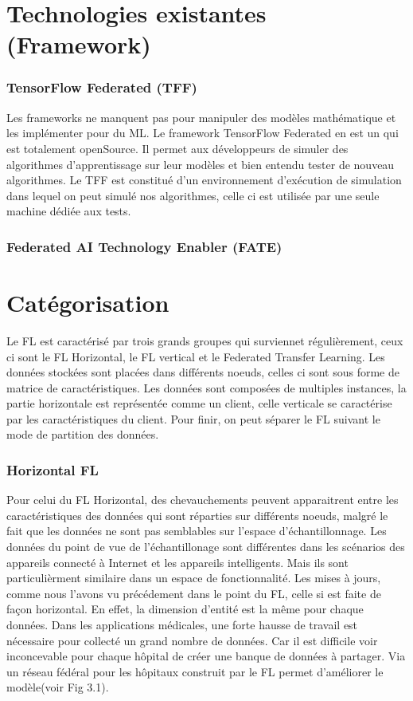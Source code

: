 \documentclass[12pt,a4paper]{report}
\begin{document}
\pagebreak

\chapter{Technologies existantes (Framework)}
\subsection{TensorFlow Federated (TFF)}

Les frameworks ne manquent pas pour manipuler des modèles mathématique et les implémenter pour du ML. Le framework TensorFlow Federated en est un qui est totalement openSource. Il permet aux développeurs de simuler des algorithmes d'apprentissage sur leur modèles et bien entendu tester de nouveau algorithmes. Le TFF est constitué d'un environnement d'exécution de simulation dans lequel on peut simulé nos algorithmes, celle ci est utilisée par une seule machine dédiée aux tests.

\subsection{Federated AI Technology Enabler (FATE)}

\chapter{Catégorisation}

Le FL est caractérisé par trois grands groupes qui surviennet régulièrement, ceux ci sont le FL Horizontal, le FL vertical et le Federated Transfer Learning. Les données stockées sont placées dans différents noeuds, celles ci sont sous forme de matrice de caractéristiques. Les données sont composées de multiples instances, la partie horizontale est représentée comme un client, celle verticale se caractérise par les caractéristiques du client. Pour finir, on peut séparer le FL suivant le mode de partition des données.\\

\subsection{Horizontal FL}

Pour celui du FL Horizontal, des chevauchements peuvent apparaitrent entre les caractéristiques des données qui sont réparties sur différents noeuds, malgré le fait que les données ne sont pas semblables sur l'espace d'échantillonnage. Les données du point de vue de l'échantillonage sont différentes dans les scénarios des appareils connecté à Internet et les appareils intelligents. Mais ils sont particulièrment similaire dans un espace de fonctionnalité. Les mises à jours, comme nous l'avons vu précédement dans le point du FL, celle si est faite de façon horizontal. En effet, la dimension d'entité est la même pour chaque données. Dans les applications médicales, une forte hausse de travail est nécessaire pour collecté un grand nombre de données. Car il est difficile voir inconcevable pour chaque hôpital de créer une banque de données à partager. Via un réseau fédéral pour les hôpitaux construit par le FL permet d'améliorer le modèle(voir Fig 3.1).
\end{document}
